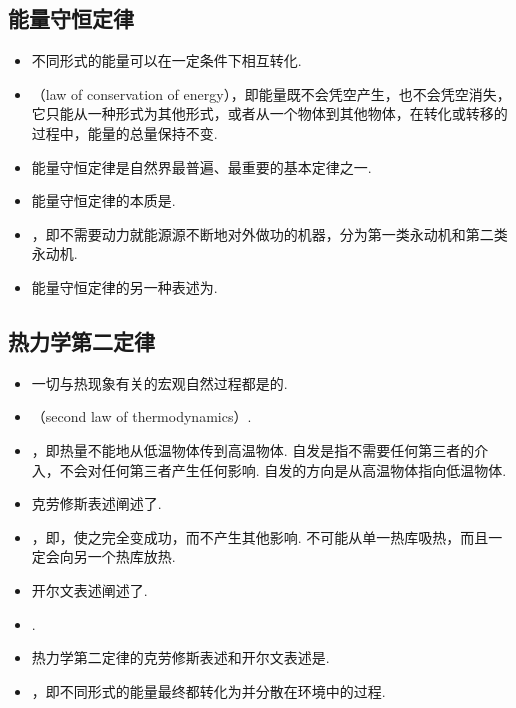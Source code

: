 \subsection{能量守恒定律}
\begin{itemize}
\item 不同形式的能量可以在一定条件下相互转化.
\item {}（law of conservation of energy），即能量既不会凭空产生，也不会凭空消失，它只能从一种形式为其他形式，或者从一个物体到其他物体，在转化或转移的过程中，能量的总量保持不变.
\item 能量守恒定律是自然界最普遍、最重要的基本定律之一.
\item 能量守恒定律的本质是.
\item {}，即不需要动力就能源源不断地对外做功的机器，分为第一类永动机和第二类永动机.
\item 能量守恒定律的另一种表述为.
\end{itemize}

\subsection{热力学第二定律}
\begin{itemize}
\item 一切与热现象有关的宏观自然过程都是的.
\item {}（second law of thermodynamics）.
\item {}，即热量不能地从低温物体传到高温物体. 自发是指不需要任何第三者的介入，不会对任何第三者产生任何影响. 自发的方向是从高温物体指向低温物体.
\item 克劳修斯表述阐述了.
\item {}，即，使之完全变成功，而不产生其他影响. 不可能从单一热库吸热，而且一定会向另一个热库放热.
\item 开尔文表述阐述了.
\item {}.
\item 热力学第二定律的克劳修斯表述和开尔文表述是.
\item {}，即不同形式的能量最终都转化为并分散在环境中的过程.
\end{itemize}
